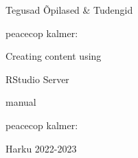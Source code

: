 \begin{titlepage}
\par{Tegusad Õpilased \& Tudengid}
\vspace{0.3\textheight}
\par{peacecop kalmer:}
\LARGE
\par{Creating content using}
\par{RStudio Server}
\normalsize
\par{manual}
\vspace{0.3\textheight}
\begin{flushright}
\par{peacecop kalmer:}
\end{flushright}
\vfill
Harku
\hfill
2022-2023
\end{titlepage}
